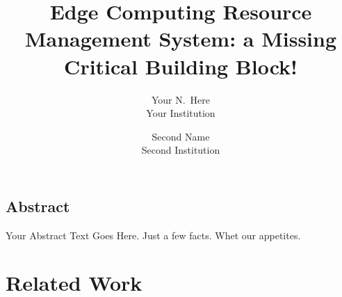 \documentclass[letterpaper,twocolumn,10pt]{article}
\begin{document}
\date{}

\title{\Large Edge Computing Resource Management System: a Missing Critical Building Block!}

\author{
{\rm Your N.\ Here}\\
Your Institution
\and
{\rm Second Name}\\
Second Institution
} %

\maketitle

\thispagestyle{empty}


\subsection*{Abstract}
Your Abstract Text Goes Here.  Just a few facts.
Whet our appetites.
        




% 
% 
\section{Related Work}




{\footnotesize 
}

\theendnotes
\end{document}
